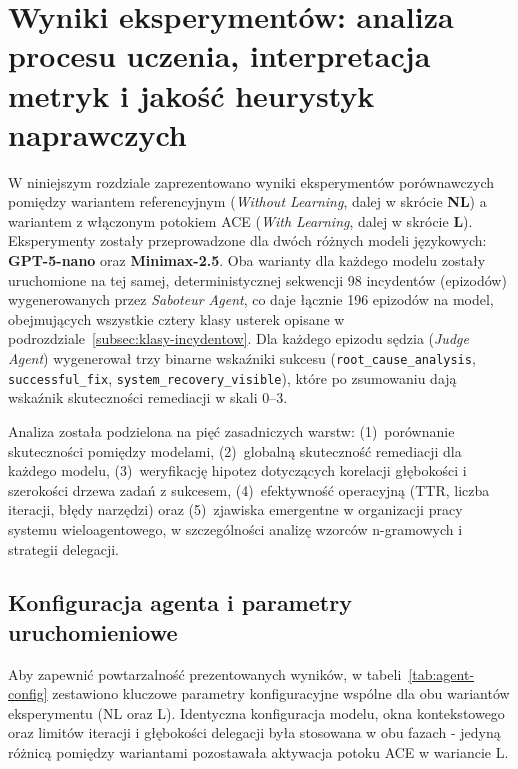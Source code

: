 \chapter{Wyniki eksperymentów: analiza procesu uczenia, interpretacja metryk i jakość heurystyk naprawczych}

W niniejszym rozdziale zaprezentowano wyniki eksperymentów porównawczych pomiędzy wariantem referencyjnym (\textit{Without Learning}, dalej w skrócie \textbf{NL}) a wariantem z włączonym potokiem ACE (\textit{With Learning}, dalej w skrócie \textbf{L}). Eksperymenty zostały przeprowadzone dla dwóch różnych modeli językowych: \textbf{GPT-5-nano} oraz \textbf{Minimax-2.5}. Oba warianty dla każdego modelu zostały uruchomione na tej samej, deterministycznej sekwencji 98 incydentów (epizodów) wygenerowanych przez \textit{Saboteur Agent}, co daje łącznie 196 epizodów na model, obejmujących wszystkie cztery klasy usterek opisane w podrozdziale~\ref{subsec:klasy-incydentow}. Dla każdego epizodu sędzia (\textit{Judge Agent}) wygenerował trzy binarne wskaźniki sukcesu (\texttt{root\_cause\_analysis}, \texttt{successful\_fix}, \texttt{system\_recovery\_visible}), które po zsumowaniu dają wskaźnik skuteczności remediacji w skali 0--3.

Analiza została podzielona na pięć zasadniczych warstw: (1)~porównanie skuteczności pomiędzy modelami, (2)~globalną skuteczność remediacji dla każdego modelu, (3)~weryfikację hipotez dotyczących korelacji głębokości i szerokości drzewa zadań z sukcesem, (4)~efektywność operacyjną (TTR, liczba iteracji, błędy narzędzi) oraz (5)~zjawiska emergentne w organizacji pracy systemu wieloagentowego, w szczególności analizę wzorców n-gramowych i strategii delegacji.

\section{Konfiguracja agenta i parametry uruchomieniowe}
\label{sec:konfiguracja-agenta}

Aby zapewnić powtarzalność prezentowanych wyników, w tabeli~\ref{tab:agent-config} zestawiono kluczowe parametry konfiguracyjne wspólne dla obu wariantów eksperymentu (NL oraz L). Identyczna konfiguracja modelu, okna kontekstowego oraz limitów iteracji i głębokości delegacji była stosowana w obu fazach - jedyną różnicą pomiędzy wariantami pozostawała aktywacja potoku ACE w wariancie L.

